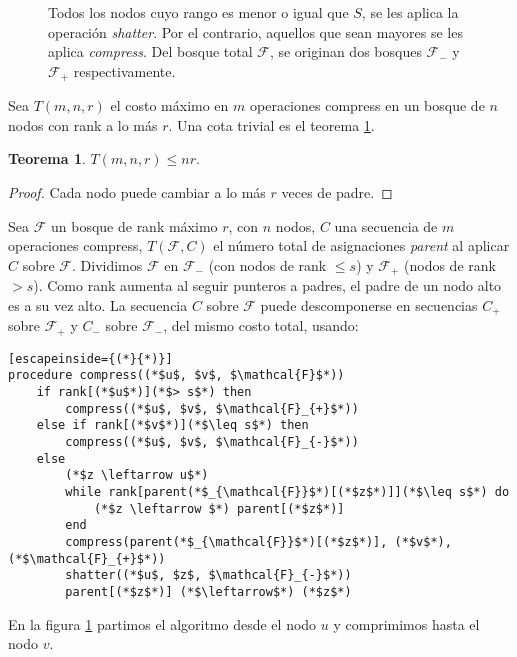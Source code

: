 \documentclass[english, spanish, fleqn, 10pt]{article}
\numberwithin{equation}{section}
\newcommand{\nparentesis}[1]{\left( #1 \right)}
\theoremstyle{definition}
\newtheorem{teorema}{Teorema}[section]
\begin{document}
\begin{itemize}
\begin{figure}[!h]
		\caption{Todos los nodos cuyo rango es menor o igual que $S$, se les aplica la operación \emph{shatter}. Por el contrario, aquellos que sean mayores se les aplica \emph{compress}. Del bosque total $\mathcal{F}$, se originan dos bosques $\mathcal{F}_-$ y $\mathcal{F}_+$ respectivamente.}
		\label{24::Shatter:Compress}
	\end{figure}
	
\end{itemize}
Sea $T\nparentesis{m, n, r}$ el costo máximo en $m$ operaciones compress en un bosque de $n$ nodos con rank a lo más $r$. Una cota trivial es el teorema \ref{24::Teo::Acotacion}.
\begin{teorema}\label{24::Teo::Acotacion}
	$T\nparentesis{m, n, r} \leq nr$.
\end{teorema}

\begin{proof}
	Cada nodo puede cambiar a lo más $r$ veces de padre.
\end{proof}

Sea $\mathcal{F}$ un bosque de rank máximo $r$, con $n$ nodos, $C$ una secuencia de $m$ operaciones compress, $T\nparentesis{\mathcal{F}, C}$ el número total de asignaciones \emph{parent} al aplicar $C$ sobre $\mathcal{F}$. Dividimos $\mathcal{F}$ en $\mathcal{F}_-$ (con nodos de rank $\leq s$) y $\mathcal{F}_{+}$ (nodos de rank $> s$). Como rank aumenta al seguir punteros a padres, el padre de un nodo alto es a su vez alto. La secuencia $C$ sobre $\mathcal{F}$ puede descomponerse en secuencias $C_{+}$ sobre $\mathcal{F}_{+}$ y $C_{-}$ sobre $\mathcal{F}_{-}$, del mismo costo total, usando:
\begin{lstlisting}[escapeinside={(*}{*)}]
procedure compress((*$u$, $v$, $\mathcal{F}$*))
	if rank[(*$u$*)](*$> s$*) then
		compress((*$u$, $v$, $\mathcal{F}_{+}$*))
	else if rank[(*$v$*)](*$\leq s$*) then
		compress((*$u$, $v$, $\mathcal{F}_{-}$*))
	else
		(*$z \leftarrow u$*)
		while rank[parent(*$_{\mathcal{F}}$*)[(*$z$*)]](*$\leq s$*) do
			(*$z \leftarrow $*) parent[(*$z$*)]
		end
		compress(parent(*$_{\mathcal{F}}$*)[(*$z$*)], (*$v$*), (*$\mathcal{F}_{+}$*))
		shatter((*$u$, $z$, $\mathcal{F}_{-}$*))
		parent[(*$z$*)] (*$\leftarrow$*) (*$z$*)
\end{lstlisting}
En la figura \ref{24::Shatter:Compress} partimos el algoritmo desde el nodo $u$ y comprimimos hasta el nodo $v$.
\end{document}
